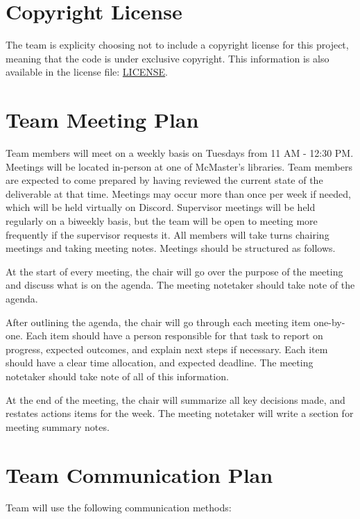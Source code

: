 \documentclass{article}
\begin{document}
\section{Copyright License}

The team is explicity choosing not to include a copyright license for this project, meaning that the code is under exclusive copyright. This information is also available in the license file: \href{../../LICENSE}{LICENSE}.

\section{Team Meeting Plan}

Team members will meet on a weekly basis on Tuesdays from 11 AM - 12:30 PM. Meetings will
be located in-person at one of McMaster's libraries. Team members are expected to come
prepared by having reviewed the current state of the deliverable at that time. Meetings may
occur more than once per week if needed, which will be held virtually on Discord. Supervisor meetings
will be held regularly on a biweekly basis, but the team will be open to meeting more frequently if
the supervisor requests it. All members will take turns chairing meetings and taking meeting notes. 
Meetings should be structured as follows.
\newline

At the start of every meeting, the chair will go over the purpose of the meeting and discuss what is on the agenda. 
The meeting notetaker should take note of the agenda.
\newline

After outlining the agenda, the chair will go through each meeting item one-by-one. Each item should 
have a person responsible for that task to report on progress, expected outcomes, and 
explain next steps if necessary. Each item should have a clear time allocation, and expected
deadline. The meeting notetaker should take note of all of this information.
\newline

At the end of the meeting, the chair will summarize all key decisions made, and restates
actions items for the week. The meeting notetaker will write a section for meeting summary notes.

\section{Team Communication Plan}

Team will use the following communication methods:
\end{document}

